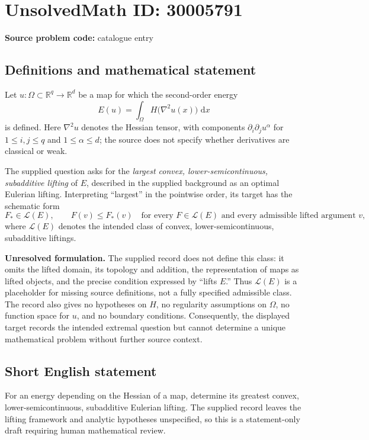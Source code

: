 \documentclass[11pt]{article}
\newcommand{\R}{\mathbb{R}}
\newcommand{\dd}{\,\mathrm{d}}
\begin{document}
\section*{UnsolvedMath ID: 30005791}
\textbf{Source problem code:} catalogue entry
\subsection{Definitions and mathematical statement}
Let \(u\colon\Omega\subset\R^q\to\R^d\) be a map for which the second-order energy
\[
E(u)=\int_\Omega H\bigl(\nabla^2u(x)\bigr)\,\dd x
\]
is defined. Here \(\nabla^2u\) denotes the Hessian tensor, with components \(\partial_i\partial_j u^\alpha\) for \(1\leq i,j\leq q\) and \(1\leq\alpha\leq d\); the source does not specify whether derivatives are classical or weak.

The supplied question asks for the \emph{largest convex, lower-semicontinuous, subadditive lifting} of \(E\), described in the supplied background as an optimal Eulerian lifting. Interpreting ``largest'' in the pointwise order, its target has the schematic form
\[
F_*\in\mathscr L(E),\qquad
F(v)\leq F_*(v)
\quad\text{for every }F\in\mathscr L(E)
\text{ and every admissible lifted argument }v,
\]
where \(\mathscr L(E)\) denotes the intended class of convex, lower-semicontinuous, subadditive liftings.

\textbf{Unresolved formulation.} The supplied record does not define this class: it omits the lifted domain, its topology and addition, the representation of maps as lifted objects, and the precise condition expressed by ``lifts \(E\).'' Thus \(\mathscr L(E)\) is a placeholder for missing source definitions, not a fully specified admissible class. The record also gives no hypotheses on \(H\), no regularity assumptions on \(\Omega\), no function space for \(u\), and no boundary conditions. Consequently, the displayed target records the intended extremal question but cannot determine a unique mathematical problem without further source context.
\subsection{Short English statement}
For an energy depending on the Hessian of a map, determine its greatest convex, lower-semicontinuous, subadditive Eulerian lifting. The supplied record leaves the lifting framework and analytic hypotheses unspecified, so this is a statement-only draft requiring human mathematical review.
\end{document}
